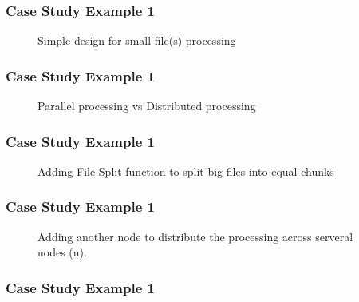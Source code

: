 \begin{frame}[plain,c]
	\frametitle{Case Study Example 1}
		\begin{figure}
		
		\caption{Simple design for small file(s) processing } \label{fig:DS1}
		\end{figure}
\end{frame}
\begin{frame}[plain,c]
	\frametitle{Case Study Example 1}
	\begin{figure}
		\centering
		
		\label{fig:DS2}
		\caption{Parallel processing vs Distributed processing } 
	\end{figure}
\end{frame}
\begin{frame}[plain,c]
	\frametitle{Case Study Example 1}
		\begin{figure}
		\centering
			
			\caption{Adding File Split function to split big files into equal chunks } \label{fig:DS3}
		\end{figure}

\end{frame}
\begin{frame}[plain,c]
	\frametitle{Case Study Example 1}
		\begin{figure}
		\centering
			
			\caption{Adding another node to distribute the processing across serveral nodes (n). } \label{fig:DS3}
		\end{figure}

\end{frame}
\begin{frame}[plain,c]
	\frametitle{Case Study Example 1}
	\begin{figure}
		\centering
		
	\end{figure}
	
\end{frame}

